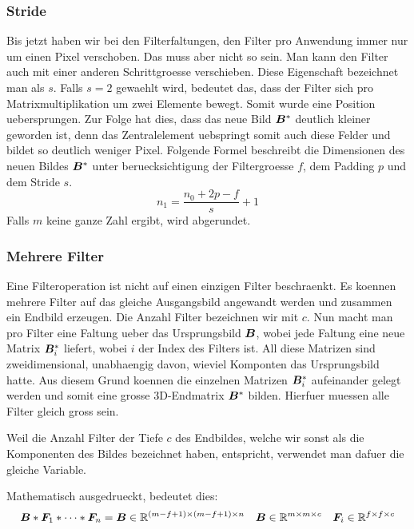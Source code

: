 \subsubsection{Stride}
Bis jetzt haben wir bei den Filterfaltungen, den Filter pro Anwendung immer nur
um einen Pixel verschoben. Das muss aber nicht so sein. Man kann den Filter
auch mit einer anderen Schrittgroesse verschieben. Diese Eigenschaft bezeichnet
man als  $s$. Falls $s = 2$ gewaehlt wird, bedeutet das, dass der
Filter sich pro Matrixmultiplikation um zwei Elemente bewegt. Somit wurde eine
Position uebersprungen. Zur Folge hat dies, dass das neue Bild $\bm{B}^*$
deutlich kleiner geworden ist, denn das Zentralelement uebspringt somit auch
diese Felder und bildet so deutlich weniger Pixel.
\para{}
Folgende Formel beschreibt die Dimensionen des neuen Bildes $\bm{B}^*$ unter
beruecksichtigung der Filtergroesse $f$, dem Padding $p$ und dem Stride $s$.
\begin{equation}
  n_1 = \frac{n_0 + 2p - f}{s} + 1
\end{equation}
Falls $m$ keine ganze Zahl ergibt, wird abgerundet.

\subsubsection{Mehrere Filter}
Eine Filteroperation ist nicht auf einen einzigen Filter beschraenkt. Es koennen
mehrere Filter auf das gleiche Ausgangsbild angewandt werden und zusammen ein
Endbild erzeugen.
\para{}
Die Anzahl Filter bezeichnen wir mit $c$.
Nun macht man pro Filter eine Faltung ueber das Ursprungsbild $\bm{B}$, wobei
jede Faltung eine neue Matrix $\bm{B}^*_i$ liefert, wobei $i$ der Index des
Filters ist. All diese Matrizen sind zweidimensional, unabhaengig davon, wieviel
Komponten das Ursprungsbild hatte. Aus diesem Grund koennen die einzelnen
Matrizen $\bm{B}^*_i$ aufeinander gelegt werden und somit eine grosse 3D-Endmatrix
$\bm{B}^*$ bilden.
Hierfuer muessen alle Filter gleich gross sein.

Weil die Anzahl Filter der Tiefe $c$ des Endbildes, welche wir sonst als die
Komponenten des Bildes bezeichnet haben, entspricht, verwendet man dafuer die gleiche Variable.

Mathematisch ausgedrueckt, bedeutet dies:
\begin{equation}
  \bm{B} * \bm{F}_1 * \cdots * \bm{F}_n = \bm{B} \in \mathbb{R}^{(m-f+1) \times (m-f+1) \times n} \quad \bm{B} \in \mathbb{R}^{m \times m \times c} \quad \bm{F}_i \in \mathbb{R}^{f \times f \times c}
\end{equation}


